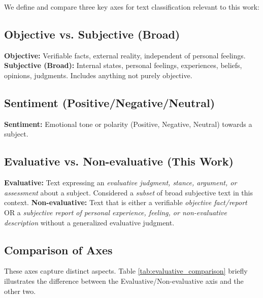 \documentclass{article}
\begin{document}
We define and compare three key axes for text classification relevant to this work:

\subsection{Objective vs. Subjective (Broad)}
\textbf{Objective:} Verifiable facts, external reality, independent of personal feelings.
\textbf{Subjective (Broad):} Internal states, personal feelings, experiences, beliefs, opinions, judgments. Includes anything not purely objective.

\subsection{Sentiment (Positive/Negative/Neutral)}
\textbf{Sentiment:} Emotional tone or polarity (Positive, Negative, Neutral) towards a subject.

\subsection{Evaluative vs. Non-evaluative (This Work)}
\textbf{Evaluative:} Text expressing an \textit{evaluative judgment, stance, argument, or assessment} about a subject. Considered a \textit{subset} of broad subjective text in this context.
\textbf{Non-evaluative:} Text that is either a verifiable \textit{objective fact/report} OR a \textit{subjective report of personal experience, feeling, or non-evaluative description} without a generalized evaluative judgment.

\subsection{Comparison of Axes}
\label{sec:comparison}

These axes capture distinct aspects. Table \ref{tab:evaluative_comparison} briefly illustrates the difference between the Evaluative/Non-evaluative axis and the other two.
\end{document}
